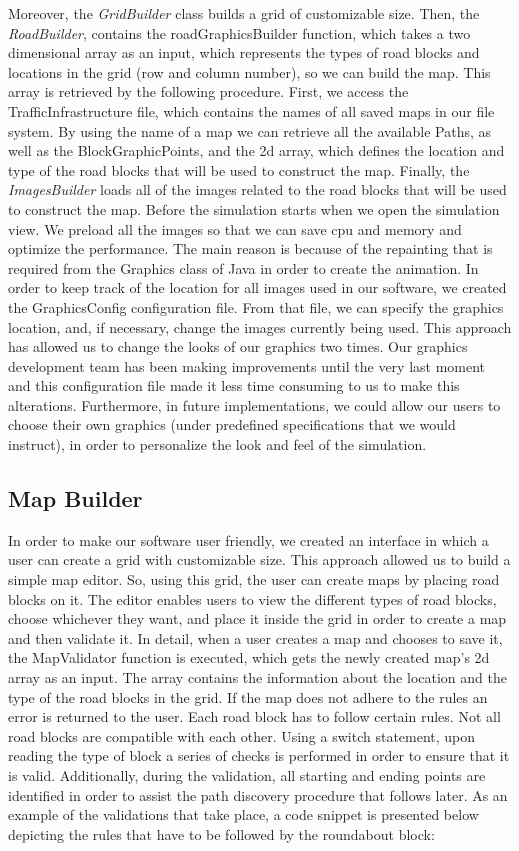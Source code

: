 \documentclass[oneside]{article}
\begin{document}
\noindent Moreover, the \textit{GridBuilder} class builds a grid of customizable size. Then, the \textit{RoadBuilder}, contains the roadGraphicsBuilder function, which takes a two dimensional array as an input, which represents the types of road blocks and locations in the grid (row and column number), so we can build the map. This array is retrieved by the following procedure. First, we access the TrafficInfrastructure file, which contains the names of all saved maps in our file system. By using the name of a map we can retrieve all the available Paths, as well as the BlockGraphicPoints, and the 2d array, which defines the location and type of the road blocks that will be used to construct the map. Finally, the \textit{ImagesBuilder} loads all of the images related to the road blocks that will be used to construct the map. Before the simulation starts when we open the simulation view. We preload all the images so that we can save cpu and memory and optimize the performance. The main reason is because of the repainting that is required from the Graphics class of Java in order to create the animation. In order to keep track of the location for all images used in our software, we created the GraphicsConfig configuration file. From that file, we can specify the graphics location, and, if necessary, change the images currently being used. This approach has allowed us to change the looks of our graphics two times. Our graphics development team has been making improvements until the very last moment and this configuration file made it less time consuming to us to make this alterations. Furthermore, in future implementations, we could allow our users to choose their own graphics (under predefined specifications that we would instruct), in order to personalize the look and feel of the simulation. 
\subsection{Map Builder} 
\noindent In order to make our software user friendly, we created an interface in which a user can create a grid with customizable size. This approach allowed us to build a simple map editor. So, using this grid, the user can create maps by placing road blocks on it. The editor enables users to view the different types of road blocks, choose whichever they want, and place it inside the grid in order to create a map and then validate it. In detail, when a user creates a map and chooses to save it, the MapValidator function is executed, which gets the newly created map's 2d array as an input. The array contains the information about the location and the type of the road blocks in the grid. If the map does not adhere to the rules an error is returned to the user. Each road block has to follow certain rules. Not all road blocks are compatible with each other. Using a switch statement, upon reading the type of block a series of checks is performed in order to ensure that it is valid. Additionally, during the validation, all starting and ending points are identified in order to assist the path discovery procedure that follows later. As an example of the validations that take place, a code snippet is presented below depicting the rules that have to be followed by the roundabout block:
\end{document}
